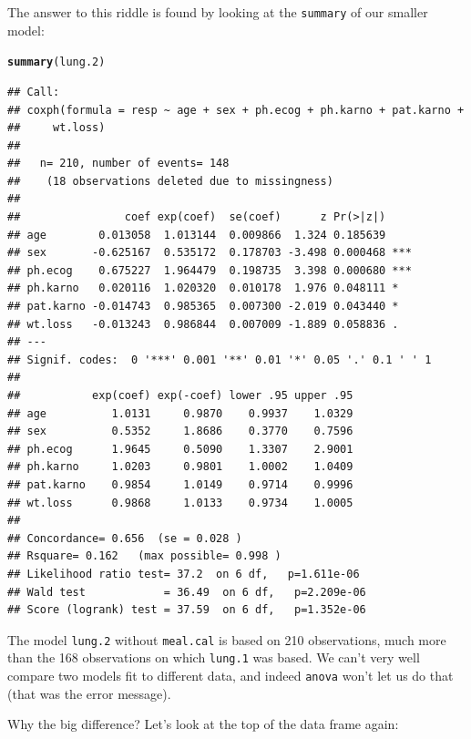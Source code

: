 \documentclass{article}\usepackage[]{graphicx}\usepackage[]{color}
\makeatletter
\newcommand{\hlstd}[1]{\textcolor[rgb]{0.345,0.345,0.345}{#1}}%
\newcommand{\hlkwd}[1]{\textcolor[rgb]{0.737,0.353,0.396}{\textbf{#1}}}%
\newenvironment{kframe}{%
 \def\at@end@of@kframe{}%
 \ifinner\ifhmode%
  \def\at@end@of@kframe{\end{minipage}}%
  \begin{minipage}{\columnwidth}%
 \fi\fi%
 \def\FrameCommand##1{\hskip\@totalleftmargin \hskip-\fboxsep
 \colorbox{shadecolor}{##1}\hskip-\fboxsep
     \hskip-\linewidth \hskip-\@totalleftmargin \hskip\columnwidth}%
 \MakeFramed {\advance\hsize-\width
   \@totalleftmargin\z@ \linewidth\hsize
   \@setminipage}}%
 {\par\unskip\endMakeFramed%
 \at@end@of@kframe}
\newenvironment{knitrout}{}{} %
\makeatother
\begin{document}
The answer to this riddle is found by looking at the \texttt{summary}
of our smaller model:

\begin{knitrout}
\color{fgcolor}\begin{kframe}
\begin{alltt}
\hlkwd{summary}\hlstd{(lung.2)}
\end{alltt}
\begin{verbatim}
## Call:
## coxph(formula = resp ~ age + sex + ph.ecog + ph.karno + pat.karno + 
##     wt.loss)
## 
##   n= 210, number of events= 148 
##    (18 observations deleted due to missingness)
## 
##                coef exp(coef)  se(coef)      z Pr(>|z|)    
## age        0.013058  1.013144  0.009866  1.324 0.185639    
## sex       -0.625167  0.535172  0.178703 -3.498 0.000468 ***
## ph.ecog    0.675227  1.964479  0.198735  3.398 0.000680 ***
## ph.karno   0.020116  1.020320  0.010178  1.976 0.048111 *  
## pat.karno -0.014743  0.985365  0.007300 -2.019 0.043440 *  
## wt.loss   -0.013243  0.986844  0.007009 -1.889 0.058836 .  
## ---
## Signif. codes:  0 '***' 0.001 '**' 0.01 '*' 0.05 '.' 0.1 ' ' 1
## 
##           exp(coef) exp(-coef) lower .95 upper .95
## age          1.0131     0.9870    0.9937    1.0329
## sex          0.5352     1.8686    0.3770    0.7596
## ph.ecog      1.9645     0.5090    1.3307    2.9001
## ph.karno     1.0203     0.9801    1.0002    1.0409
## pat.karno    0.9854     1.0149    0.9714    0.9996
## wt.loss      0.9868     1.0133    0.9734    1.0005
## 
## Concordance= 0.656  (se = 0.028 )
## Rsquare= 0.162   (max possible= 0.998 )
## Likelihood ratio test= 37.2  on 6 df,   p=1.611e-06
## Wald test            = 36.49  on 6 df,   p=2.209e-06
## Score (logrank) test = 37.59  on 6 df,   p=1.352e-06
\end{verbatim}
\end{kframe}
\end{knitrout}

The model \texttt{lung.2} without \texttt{meal.cal} is based on 210 observations, much
more than the 168 observations on which \texttt{lung.1} was based. We
can't very well compare two models fit to different data, and indeed
\texttt{anova} won't let us do that (that was the error message).

Why the big difference? Let's look at the top of the data frame again:
\end{document}
